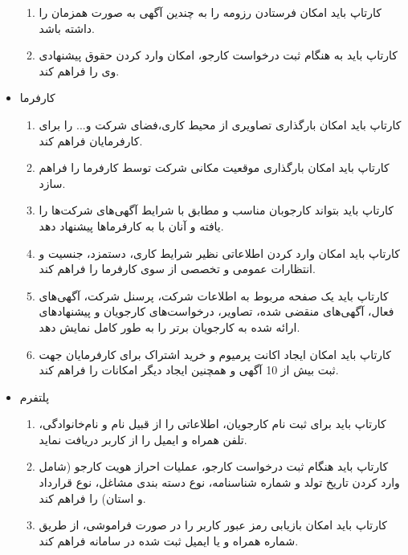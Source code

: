 \documentclass{report}
\begin{document}
\begin{itemize}
\begin{enumerate}
							\item 
							کارتاپ باید امکان فرستادن رزومه را به چندین آگهی به صورت همزمان را داشته باشد.
							\item 
							کارتاپ باید به هنگام ثبت درخواست کارجو، امکان وارد کردن حقوق پیشنهادی وی را فراهم کند. 
						\end{enumerate}
					
					\item کارفرما
						\begin{enumerate}
							\item 
							کارتاپ باید امکان بارگذاری تصاویری از محیط کاری،فضای شرکت و... را برای کارفرمایان فراهم کند.
							
							\item 
							کارتاپ باید امکان بارگذاری موقعیت مکانی شرکت توسط کارفرما را فراهم سازد.
							\item 
							کارتاپ باید بتواند کارجوبان مناسب و مطابق با شرایط آگهی‌های شرکت‌ها را یافته و آنان با به کارفرما‌ها پیشنهاد دهد.
							
							\item 
							کارتاپ باید امکان وارد کردن اطلاعاتی نظیر شرایط کاری، دستمزد، جنسیت و انتظارات عمومی و تخصصی از سوی کارفرما را فراهم کند.
							
							\item 
							کارتاپ باید یک صفحه مربوط به اطلاعات شرکت، پرسنل شرکت، آگهی‌های فعال، آگهی‌های منقضی شده، تصاویر، درخواست‌های کارجویان و پیشنهاد‌های ارائه شده به کارجویان برتر را به طور کامل نمایش دهد.
							
							\item 
							کارتاپ باید امکان ایجاد اکانت پرمیوم و خرید اشتراک برای کارفرمایان جهت ثبت بیش از 10 آگهی و همچنین ایجاد دیگر امکانات را فراهم کند.
						\end{enumerate}
					
					\item پلتفرم
						\begin{enumerate}
							\item 
							کارتاپ باید برای ثبت نام کارجویان، اطلاعاتی را از قبیل نام و نام‌خانوادگی، تلفن همراه و ایمیل را از کاربر دریافت نماید.
							
							\item 
							کارتاپ باید هنگام ثبت درخواست کارجو، عملیات احراز هویت کارجو (شامل وارد کردن تاریخ تولد و شماره شناسنامه، نوع دسته بندی مشاغل، نوع قرارداد و استان) را فراهم کند.
							
							\item
							کارتاپ باید امکان بازیابی رمز عبور کاربر را در صورت فراموشی، از طریق شماره همراه و یا ایمیل ثبت شده در سامانه فراهم کند.
							

\end{enumerate}
\end{itemize}
\end{document}
